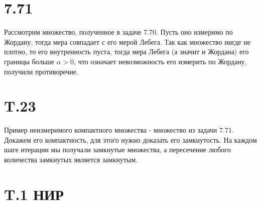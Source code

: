 \documentclass[12pt]{article}
\begin{document}
\section{7.71}
Рассмотрим множество, полученное в задаче $7.70$. Пусть оно измеримо по Жордану, тогда мера совпадает с его мерой Лебега. 
Так как множество нигде не плотно, то его внутренность пуста, тогда мера Лебега (а значит и Жордана) его границы больше $\alpha > 0$, что означает невозможность 
его измерить по Жордану, получили противоречие. 
\section{T.23}
Пример неизмеримого компактного множества - множество из задачи $7.71$. Докажем его компактность, для этого 
нужно доказать его замкнутость. На каждом шаге итерации мы получали замкнутые множества, а пересечение любого количества 
замкнутых является замкнутым.
\section{T.1 НИР}
\end{document}
